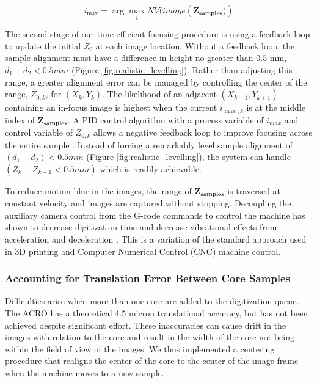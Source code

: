 \documentclass[a4paper,12pt]{article}
\begin{document}
\[
  i_{\max} = \arg\max_{i} NV(image(\boldsymbol{{Z_\text{samples}})})
  \]

The second stage of our time-efficient focusing procedure is using a feedback loop to update the initial $Z_0$ at each image location. 
Without a feedback loop, the sample alignment must have a difference in height no greater than 0.5 mm, $d_1 - d_2 < 0.5 mm $ (Figure \ref{fig:realistic_levelling}). 
Rather than adjusting this range, a greater alignment error can be managed by controlling the center of the range, $Z_{0,k}$, for $(X_k,Y_k)$. 
The likelihood of an adjacent %
$(X_{k+1}, Y_{k+1})$ containing an in-focus image is highest when the current $i_{{\max,k}}$ is at the middle index of $\boldsymbol{Z_{samples}}$. 
A PID control algorithm with a process variable of $i_{max}$ and control variable of $Z_{0,k}$ allows a negative feedback loop to improve focusing across the entire sample \citep{odwyer_summary_2000}. 
Instead of forcing a remarkably level sample alignment of $(d_1 - d_2) < 0.5mm$ (Figure \ref{fig:realistic_levelling}), the system can handle $(Z_{k} - Z_{k+1} < 0.5mm)$ which is readily achievable. %

To reduce motion blur in the images, the range of $\boldsymbol{Z_{\text{samples}}}$ is traversed at constant velocity and images are captured without stopping. 
Decoupling the auxiliary camera control from the G-code commands to control the machine has shown to decrease digitization time and decrease vibrational effects from acceleration and deceleration \citep{propst_time_2025}.
This is a variation of the standard approach used in 3D printing and Computer Numerical Control (CNC) machine control. 
  
\subsubsection{Accounting for Translation Error Between Core Samples}

Difficulties arise when more than one core are added to the digitization queue.
The ACRO has a theoretical 4.5 micron translational accuracy, but has not been achieved despite significant effort.
These inaccuracies can cause drift in the images with relation to the core and result in the width of the core not being within the field of view of the images.
We thus implemented a centering procedure that realigns the center of the core to the center of the image frame when the machine moves 
to a new sample. 
\end{document}
